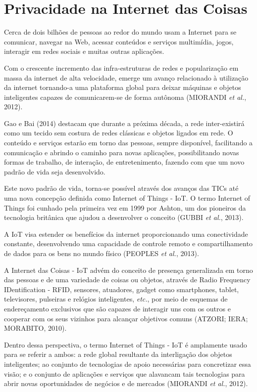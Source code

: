 \section{Privacidade na Internet das Coisas} \label{s:privacidade_na_internet_das_coisas}

Cerca de dois bilhões de pessoas ao redor do mundo usam a Internet para se comunicar, navegar na Web, acessar conteúdos e serviços multimídia, jogos, interagir em redes sociais e muitas outras aplicações.

Com o crescente incremento das infra-estruturas de redes e popularização em massa da internet de alta velocidade, emerge um avanço relacionado à utilização da internet tornando-a uma plataforma global para deixar máquinas e objetos inteligentes capazes de comunicarem-se de forma autônoma (MIORANDI \textit{et al.}, 2012).

Gao e Bai (2014) destacam que durante a próxima década, a rede inter-existirá como um tecido sem costura de redes clássicas e objetos ligados em rede. O conteúdo e serviços estarão em torno das pessoas, sempre disponível, facilitando a comunicação e abrindo o caminho para novas aplicações, possibilitando novas formas de trabalho, de interação, de entretenimento, fazendo com que um novo padrão de vida seja desenvolvido.

Este novo padrão de vida, torna-se possível através dos avanços das TICs até uma nova concepção definida como Internet of Things - IoT. O termo Internet of Things foi cunhado pela primeira vez em 1999 por Ashton, um dos pioneiros da tecnologia britânica que ajudou a desenvolver o conceito (GUBBI \textit{et al.}, 2013).

A IoT visa estender os benefícios da internet proporcionando uma conectividade constante, desenvolvendo uma capacidade de controle remoto e compartilhamento de dados para os bens no mundo físico (PEOPLES \textit{et al.}, 2013).

A Internet das Coisas - IoT advém do conceito de presença generalizada em torno das pessoas e de uma variedade de coisas ou objetos, através de Radio Frequency IDentification - RFID, sensores, atuadores, gadget como smartphones, tablet, televisores, pulseiras e relógios inteligentes, \textit{etc.}, por meio de esquemas de endereçamento exclusivos que são capazes de interagir uns com os outros e cooperar com os seus vizinhos para alcançar objetivos comuns (ATZORI; IERA; MORABITO, 2010).

Dentro dessa perspectiva, o termo Internet of Things - IoT é amplamente usado para se referir a ambos: a rede global resultante da interligação dos objetos inteligentes; ao conjunto de tecnologias de apoio necessárias para concretizar essa visão; e o conjunto de aplicações e serviços que alavancam tais tecnologias para abrir novas oportunidades de negócios e de mercados (MIORANDI \textit{et al.}, 2012).

